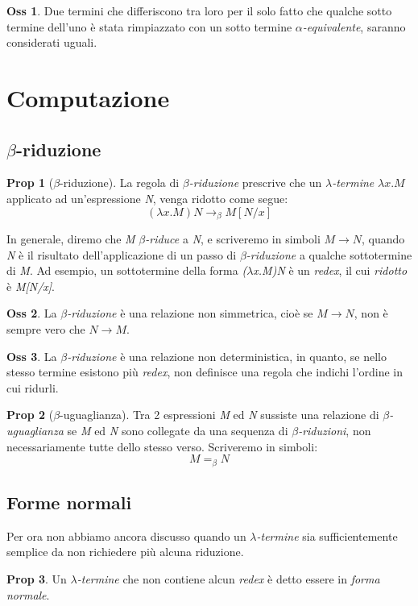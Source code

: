 \documentclass[12pt, a4paper]{report}
\theoremstyle{definition}
\newtheorem{proposition}{Prop}[section]
\newtheorem*{observation}{Oss}
\newcommand{\red}{\to_\beta}
\newcommand{\beq}{=_\beta}
\begin{document}
\begin{observation}
    Due termini che differiscono tra loro per il solo fatto che qualche sotto
    termine dell'uno è stata rimpiazzato con un sotto termine
    \emph{$\alpha$-equivalente}, saranno considerati uguali.
\end{observation}

\section{Computazione}

\subsection{$\beta$-riduzione}
\begin{proposition}[$\beta$-riduzione]
    La regola di \emph{$\beta$-riduzione} prescrive che un \emph{$\lambda$-termine}
    \(\lambda x.M\) applicato ad un'espressione \emph{N}, venga ridotto come segue:
    \[(\lambda x.M)N\red M[N/x]\]
\end{proposition}

In generale, diremo che \emph{M} \emph{$\beta$-riduce} a \emph{N}, e scriveremo
in simboli $M\to N$, quando \emph{N} è il risultato dell'applicazione di un passo
di \emph{$\beta$-riduzione} a qualche sottotermine di \emph{M}. Ad esempio, un
sottotermine della forma \emph{($\lambda$x.M)N} è un \emph{redex}, il cui
\emph{ridotto} è \emph{M[N/x]}.

\begin{observation}
    La \emph{$\beta$-riduzione} è una relazione non simmetrica, cioè se $M\to N$,
    non è sempre vero che $N\to M$.
\end{observation}
\begin{observation}
    La \emph{$\beta$-riduzione} è una relazione non deterministica, in quanto, se
    nello stesso termine esistono più \emph{redex}, non definisce una regola
    che indichi l'ordine in cui ridurli.
\end{observation}

\begin{proposition}[$\beta$-uguaglianza]
    Tra 2 espressioni \emph{M} ed \emph{N} sussiste una relazione di
    \emph{$\beta$-uguaglianza} se \emph{M} ed \emph{N} sono collegate da una
    sequenza di \emph{$\beta$-riduzioni}, non necessariamente tutte dello stesso
    verso. Scriveremo in simboli:
    \[M\beq N\]
\end{proposition}

\subsection{Forme normali}
Per ora non abbiamo ancora discusso quando un \emph{$\lambda$-termine} sia
sufficientemente semplice da non richiedere più alcuna riduzione.
\begin{proposition}
    Un \emph{$\lambda$-termine} che non contiene alcun \emph{redex} è detto essere
    in \emph{forma normale}.
\end{proposition}
\end{document}
